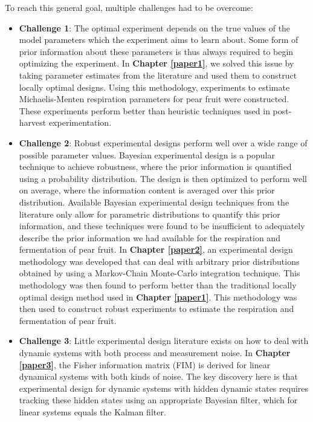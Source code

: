 To reach this general goal, multiple challenges had to be overcome:
\begin{itemize}
	\item \textbf{Challenge 1}: The optimal experiment depends on the true values of the model parameters which the experiment aims to learn about. Some form of prior information about these parameters is thus always required to begin optimizing the experiment. In \textbf{Chapter \ref{paper1}}, we solved this issue by taking parameter estimates from the literature and used them to construct locally optimal designs. Using this methodology, experiments to estimate Michaelis-Menten respiration parameters for pear fruit were constructed. These experiments perform better than heuristic techniques used in post-harvest experimentation.
	\item \textbf{Challenge 2}: Robust experimental designs perform well over a wide range of possible parameter values. Bayesian experimental design is a popular technique to achieve robustness, where the prior information is quantified using a probability distribution. The design is then optimized to perform well on average, where the information content is averaged over this prior distribution. Available Bayesian experimental design techniques from the literature only allow for parametric distributions to quantify this prior information, and these techniques were found to be insufficient to adequately describe the prior information we had available for the respiration and fermentation of pear fruit. In \textbf{Chapter \ref{paper2}}, an experimental design methodology was developed that can deal with arbitrary prior distributions obtained by using a Markov-Chain Monte-Carlo integration technique. This methodology was then found to perform better than the traditional locally optimal design method used in \textbf{Chapter \ref{paper1}}. This methodology was then used to construct robust experiments to estimate the respiration and fermentation of pear fruit.
	\item \textbf{Challenge 3}: Little experimental design literature exists on how to deal with dynamic systems with both process and measurement noise. In \textbf{Chapter \ref{paper3}}, the Fisher information matrix (FIM) is derived for linear dynamical systems with both kinds of noise. The key discovery here is that experimental design for dynamic systems with hidden dynamic states requires tracking these hidden states using an appropriate Bayesian filter, which for linear systems equals the Kalman filter.  

\end{itemize}
